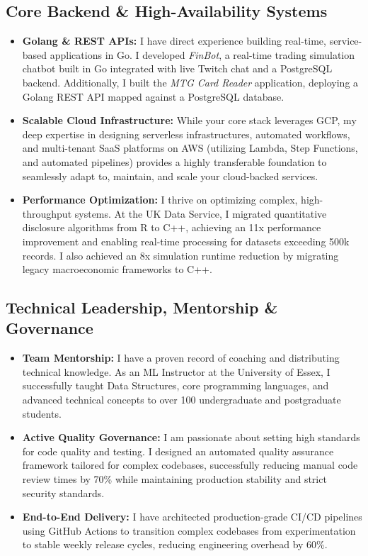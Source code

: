\documentclass[11pt,a4paper]{article}
\begin{document}
\subsection*{Core Backend \& High-Availability Systems}
\begin{itemize}[leftmargin=*,noitemsep,topsep=0pt]
    \item \textbf{Golang \& REST APIs:} I have direct experience building real-time, service-based applications in Go. I developed \textit{FinBot}, a real-time trading simulation chatbot built in Go integrated with live Twitch chat and a PostgreSQL backend. Additionally, I built the \textit{MTG Card Reader} application, deploying a Golang REST API mapped against a PostgreSQL database.
    \item \textbf{Scalable Cloud Infrastructure:} While your core stack leverages GCP, my deep expertise in designing serverless infrastructures, automated workflows, and multi-tenant SaaS platforms on AWS (utilizing Lambda, Step Functions, and automated pipelines) provides a highly transferable foundation to seamlessly adapt to, maintain, and scale your cloud-backed services.
    \item \textbf{Performance Optimization:} I thrive on optimizing complex, high-throughput systems. At the UK Data Service, I migrated quantitative disclosure algorithms from R to C++, achieving an 11x performance improvement and enabling real-time processing for datasets exceeding 500k records. I also achieved an 8x simulation runtime reduction by migrating legacy macroeconomic frameworks to C++.
\end{itemize}

\subsection*{Technical Leadership, Mentorship \& Governance}
\begin{itemize}[leftmargin=*,noitemsep,topsep=0pt]
    \item \textbf{Team Mentorship:} I have a proven record of coaching and distributing technical knowledge. As an ML Instructor at the University of Essex, I successfully taught Data Structures, core programming languages, and advanced technical concepts to over 100 undergraduate and postgraduate students.
    \item \textbf{Active Quality Governance:} I am passionate about setting high standards for code quality and testing. I designed an automated quality assurance framework tailored for complex codebases, successfully reducing manual code review times by 70\% while maintaining production stability and strict security standards.
    \item \textbf{End-to-End Delivery:} I have architected production-grade CI/CD pipelines using GitHub Actions to transition complex codebases from experimentation to stable weekly release cycles, reducing engineering overhead by 60\%.
\end{itemize}
\end{document}
